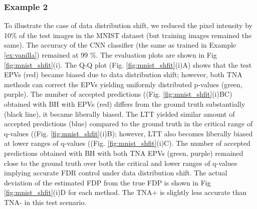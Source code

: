 \documentclass[10pt,letterpaper]{article}
\begin{document}
\subsubsection*{Example 2} To illustrate the case of data distribution shift, we reduced the pixel intensity by 10\% of the test images in the MNIST dataset (but training images remained the same).
The accuracy of the CNN classifier (the same as trained in Example \ref{ex:vanilla}) remained at 99 \%.
The evaluation plots are shown in Fig \ref{fig:mnist_shfit}(i).
The Q-Q plot (Fig. \ref{fig:mnist_shfit}(i)A) shows that the test EPVs (red) became biased due to data distribution shift; however, both TNA methods can correct the EPVs yielding uniformly distributed p-values (green, purple).
The number of accepted predictions ((Fig. \ref{fig:mnist_shfit}(i)BC) obtained with BH with EPVs (red) differs from the ground truth substantially (black line), it became liberally biased.
The LTT yielded similar amount of accepted predictions (blue) compared to the ground truth in the critical range of q-values ((Fig. \ref{fig:mnist_shfit}(i)B); however, LTT also becomes liberally biased at lower ranges of q-values ((Fig. \ref{fig:mnist_shfit}(i)C).
The number of accepted predictions obtained with BH with both TNA EPVs (green, purple) remained close to the ground truth over both the critical and lower ranges of q-values implying accurate FDR control under data distribution shift.
The actual deviation of the estimated FDP from the true FDP is shown in Fig \ref{fig:mnist_shfit}(i)D for each method.
The TNA+ is slightly less accurate than TNA- in this test scenario.
\end{document}
